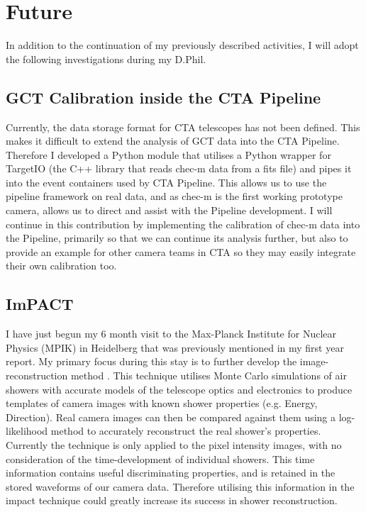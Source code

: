 \documentclass[%
amsmath,amssymb,
onecolumn,
a4paper,
10pt
]{article}%
\newcommand*\glsr[2][]{\glsdisp[#1]{#2}{\glsentryshort{#2} (\glsentrylong{#2})}}
\begin{document}
	\section{Future}
	In addition to the continuation of my previously described activities, I will adopt the following investigations during my D.Phil.
	
	\subsection{GCT Calibration inside the CTA Pipeline}
	Currently, the data storage format for CTA telescopes has not been defined. This makes it difficult to extend the analysis of GCT data into the CTA Pipeline. Therefore I developed a Python module that utilises a Python wrapper for TargetIO (the C++ library that reads \gls{chec-m} data from a fits file) and pipes it into the event containers used by CTA Pipeline. This allows us to use the pipeline framework on real data, and as \gls{chec-m} is the first working prototype camera, allows us to direct and assist with the Pipeline development. I will continue in this contribution by implementing the calibration of \gls{chec-m} data into the Pipeline, primarily so that we can continue its analysis further, but also to provide an example for other camera teams in CTA so they may easily integrate their own calibration too.
	
	\subsection{ImPACT}
	I have just begun my 6 month visit to the Max-Planck Institute for Nuclear Physics (MPIK) in Heidelberg that was previously mentioned in my first year report. My primary focus during this stay is to further develop the image-reconstruction method \glsr{impact} \citep{Parsons2014}. This technique utilises Monte Carlo simulations of air showers with accurate models of the telescope optics and electronics to produce templates of camera images with known shower properties (e.g. Energy, Direction). Real camera images can then be compared against them using a log-likelihood method to accurately reconstruct the real shower's properties. Currently the technique is only applied to the pixel intensity images, with no consideration of the time-development of individual showers. This time information contains useful discriminating properties, and is retained in the stored waveforms of our camera data. Therefore utilising this information in the \gls{impact} technique could greatly increase its success in shower reconstruction.
	
\end{document}
